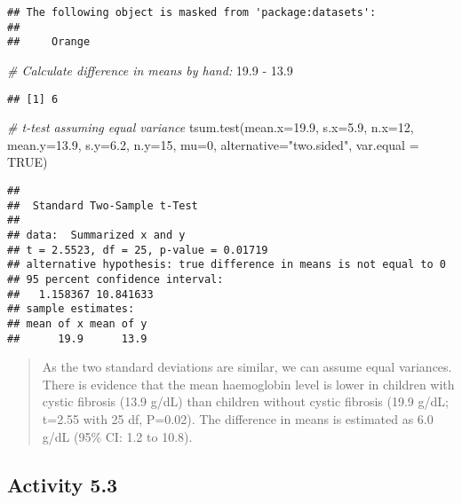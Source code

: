 \documentclass[
]{memoir}
\newenvironment{Shaded}{\begin{snugshade}}{\end{snugshade}}
\newcommand{\AttributeTok}[1]{\textcolor[rgb]{0.77,0.63,0.00}{#1}}
\newcommand{\CommentTok}[1]{\textcolor[rgb]{0.56,0.35,0.01}{\textit{#1}}}
\newcommand{\ConstantTok}[1]{\textcolor[rgb]{0.00,0.00,0.00}{#1}}
\newcommand{\DecValTok}[1]{\textcolor[rgb]{0.00,0.00,0.81}{#1}}
\newcommand{\FloatTok}[1]{\textcolor[rgb]{0.00,0.00,0.81}{#1}}
\newcommand{\FunctionTok}[1]{\textcolor[rgb]{0.00,0.00,0.00}{#1}}
\newcommand{\NormalTok}[1]{#1}
\newcommand{\SpecialCharTok}[1]{\textcolor[rgb]{0.00,0.00,0.00}{#1}}
\newcommand{\StringTok}[1]{\textcolor[rgb]{0.31,0.60,0.02}{#1}}
\begin{document}
\begin{verbatim}
## The following object is masked from 'package:datasets':
## 
##     Orange
\end{verbatim}

\begin{Shaded}
\begin{Highlighting}[]
\CommentTok{\# Calculate difference in means by hand:}
\FloatTok{19.9} \SpecialCharTok{{-}} \FloatTok{13.9}
\end{Highlighting}
\end{Shaded}

\begin{verbatim}
## [1] 6
\end{verbatim}

\begin{Shaded}
\begin{Highlighting}[]
\CommentTok{\# t{-}test assuming equal variance}
\FunctionTok{tsum.test}\NormalTok{(}\AttributeTok{mean.x=}\FloatTok{19.9}\NormalTok{, }\AttributeTok{s.x=}\FloatTok{5.9}\NormalTok{, }\AttributeTok{n.x=}\DecValTok{12}\NormalTok{,}
          \AttributeTok{mean.y=}\FloatTok{13.9}\NormalTok{, }\AttributeTok{s.y=}\FloatTok{6.2}\NormalTok{, }\AttributeTok{n.y=}\DecValTok{15}\NormalTok{,}
          \AttributeTok{mu=}\DecValTok{0}\NormalTok{, }\AttributeTok{alternative=}\StringTok{"two.sided"}\NormalTok{, }\AttributeTok{var.equal =} \ConstantTok{TRUE}\NormalTok{)}
\end{Highlighting}
\end{Shaded}

\begin{verbatim}
## 
##  Standard Two-Sample t-Test
## 
## data:  Summarized x and y
## t = 2.5523, df = 25, p-value = 0.01719
## alternative hypothesis: true difference in means is not equal to 0
## 95 percent confidence interval:
##   1.158367 10.841633
## sample estimates:
## mean of x mean of y 
##      19.9      13.9
\end{verbatim}

\begin{quote}
As the two standard deviations are similar, we can assume equal variances. There is evidence that the mean haemoglobin level is lower in children with cystic fibrosis (13.9 g/dL) than children without cystic fibrosis (19.9 g/dL; t=2.55 with 25 df, P=0.02). The difference in means is estimated as 6.0 g/dL (95\% CI: 1.2 to 10.8).
\end{quote}

\hypertarget{activity-5.3}{%
\subsection*{Activity 5.3}\label{activity-5.3}}
\end{document}
